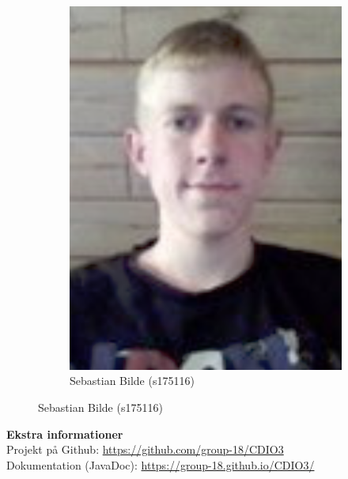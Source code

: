 \begin{figure}[H]
\begin{subfigure}{0.25\textwidth}
		\includegraphics[width=\linewidth]{graphics/members/sebastian}
		\caption*{Sebastian Bilde (s175116)}
	\end{subfigure}
\end{figure}

\vspace{1.2cm}
\noindent
{\huge\textbf{Ekstra informationer}}\\

\noindent
Projekt på Github: \url{https://github.com/group-18/CDIO3} \\
Dokumentation (JavaDoc): \url{https://group-18.github.io/CDIO3/}

